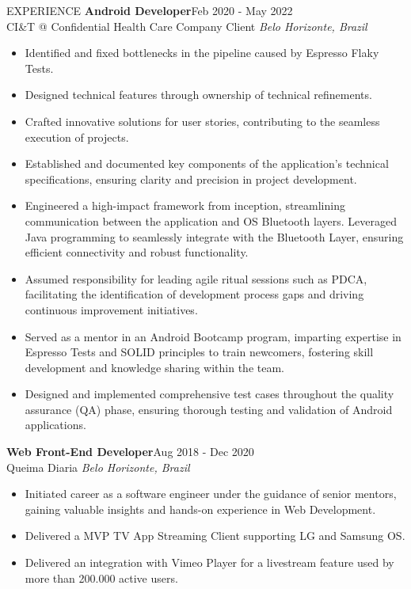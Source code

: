 \begin{rSection}{EXPERIENCE}
    \textbf{Android Developer}\hfill Feb 2020 - May 2022\\
        CI\&T @ Confidential Health Care Company Client \hfill \textit{Belo Horizonte, Brazil}
    \begin{itemize}
        \itemsep -3pt {} 
        \item Identified and fixed bottlenecks in the pipeline caused by Espresso Flaky Tests.
        \item Designed technical features through ownership of technical refinements. 
            \item Crafted innovative solutions for user stories, contributing to the seamless execution of projects.
            \item Established and documented key components of the application's technical specifications, 
                ensuring clarity and precision in project development.
            \item Engineered a high-impact framework from inception, streamlining communication between the 
                application and OS Bluetooth layers. Leveraged Java programming to seamlessly integrate with 
                the Bluetooth Layer, ensuring efficient connectivity and robust functionality. 
            \item Assumed responsibility for leading agile ritual sessions such as PDCA, facilitating the 
                identification of development process gaps and driving continuous improvement initiatives.
            \item Served as a mentor in an Android Bootcamp program, imparting expertise in Espresso Tests 
                and SOLID principles to train newcomers, fostering skill development and knowledge sharing within the team.
            \item Designed and implemented comprehensive test cases throughout the quality assurance (QA) phase, 
                ensuring thorough testing and validation of Android applications.
        \end{itemize}

    \textbf{Web Front-End Developer}\hfill Aug 2018 - Dec 2020\\
        Queima Diaria \hfill \textit{Belo Horizonte, Brazil}
    \begin{itemize}
        \itemsep -3pt {} 
        \item Initiated career as a software engineer under the guidance of senior mentors, 
            gaining valuable insights and hands-on experience in Web Development.    
            \item Delivered a MVP TV App Streaming Client supporting LG and Samsung OS.
            \item Delivered an integration with Vimeo Player for a livestream feature used by
                more than 200.000 active users.
        \end{itemize}

\end{rSection} 
\newpage